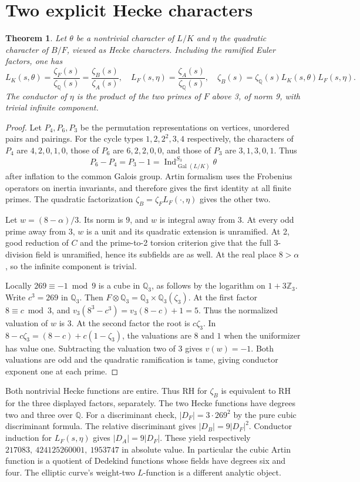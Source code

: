 \documentclass[11pt]{article}
\newtheorem{theorem}{Theorem}
\newcommand{\Q}{\mathbb Q}
\newcommand{\Gal}{\operatorname{Gal}}
\begin{document}
\section{Two explicit Hecke characters}
\begin{theorem}\label{zeta}
Let \(\theta\) be a nontrivial character of \(L/K\) and \(\eta\) the quadratic
character of \(B/F\), viewed as Hecke characters. Including the ramified Euler
factors, one has
\[
 L_K(s,\theta)=\frac{\zeta_F(s)}{\zeta_\Q(s)}
              =\frac{\zeta_B(s)}{\zeta_A(s)},\quad
 L_F(s,\eta)=\frac{\zeta_A(s)}{\zeta_\Q(s)},\quad
 \zeta_B(s)=\zeta_\Q(s)L_K(s,\theta)L_F(s,\eta).
\]
The conductor of \(\eta\) is the product of the two primes of \(F\) above 3,
of norm 9, with trivial infinite component.
\end{theorem}
\begin{proof}
Let \(P_4,P_6,P_3\) be the permutation representations on vertices, unordered
pairs and pairings. For the cycle types \(1,2,2^2,3,4\) respectively, the
characters of \(P_4\) are \(4,2,0,1,0\), those of \(P_6\) are \(6,2,2,0,0\),
and those of \(P_3\) are \(3,1,3,0,1\). Thus
\[
 P_6-P_4=P_3-1=\operatorname{Ind}_{\Gal(L/K)}^{S_3}\theta
\]
after inflation to the common Galois group. Artin formalism uses the
Frobenius operators on inertia invariants, and therefore gives the first
identity at all finite primes. The quadratic factorization
\(\zeta_B=\zeta_F L_F(\cdot,\eta)\) gives the other two.

Let \(w=(8-\alpha)/3\). Its norm is \(9\), and \(w\) is integral away
from 3. At every odd prime away from 3, \(w\) is a unit and its quadratic
extension is unramified. At 2, good reduction of \(C\) and the
prime-to-2 torsion criterion give that the full 3-division field is
unramified, hence its subfields are as well. At the real place \(8>\alpha\),
so the infinite component is trivial.

Locally \(269\equiv-1\bmod9\) is a cube in \(\Q_3\), as follows by the
logarithm on \(1+3\mathbb Z_3\). Write \(c^3=269\) in \(\Q_3\). Then
\(F\otimes\Q_3=\Q_3\times\Q_3(\zeta_3)\).
At the first factor \(8\equiv c\bmod3\), and
\(v_3(8^3-c^3)=v_3(8-c)+1=5\).
Thus the normalized valuation of \(w\) is \(3\).
At the second factor the root is \(c\zeta_3\). In
\(8-c\zeta_3=(8-c)+c(1-\zeta_3)\), the valuations are \(8\) and \(1\)
when the uniformizer has value one. Subtracting the valuation two of 3
gives \(v(w)=-1\). Both valuations are odd and the quadratic ramification is
tame, giving conductor exponent one at each prime.
\end{proof}
Both nontrivial Hecke functions are entire. Thus RH for \(\zeta_B\)
is equivalent to RH for the three displayed factors, separately.
The two Hecke functions have degrees two and three over \(\Q\).
For a discriminant check, \(|D_F|=3\cdot269^2\) by the pure cubic
discriminant formula. The relative discriminant gives
\(|D_B|=9|D_F|^2\). Conductor induction for \(L_F(s,\eta)\)
gives \(|D_A|=9|D_F|\). These yield respectively
\(217083,\ 424125260001,\ 1953747\) in absolute value.
In particular the cubic Artin function is a quotient of Dedekind functions
whose fields have degrees six and four. The elliptic curve's weight-two
\(L\)-function is a different analytic object.
\end{document}
